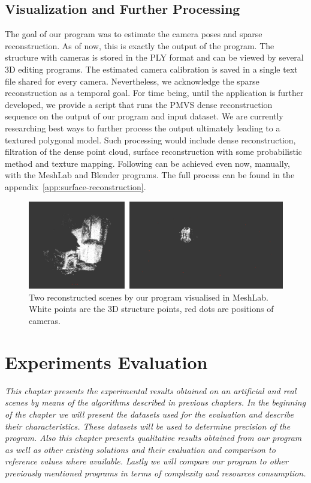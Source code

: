 \section{Visualization and Further Processing}
The goal of our program was to estimate the camera poses and sparse reconstruction. As of now, this is exactly the output of the program. The structure with cameras is stored in the PLY format and can be viewed by several 3D editing programs. The estimated camera calibration is saved in a single text file shared for every camera. Nevertheless, we acknowledge the sparse reconstruction as a temporal goal. For time being, until the application is further developed, we provide a script that runs the PMVS dense reconstruction sequence on the output of our program and input dataset. We are currently researching best ways to further process the output ultimately leading to a textured polygonal model. Such processing would include dense reconstruction, filtration of the dense point cloud, surface reconstruction with some probabilistic method and texture mapping. Following can be achieved even now, manually, with the MeshLab and Blender programs. The full process can be found in the appendix~\ref{app:surface-reconstruction}.

\begin{figure}[ht]
	\begin{center}
		\includegraphics[keepaspectratio,width=\textwidth]{fig/visualisation.pdf}
	\end{center}
	\caption{Two reconstructed scenes by our program visualised in MeshLab. White points are the 3D structure points, red dots are positions of cameras.}
	\label{fig:visualisation}
\end{figure}

\chapter{Experiments Evaluation}
\label{chapter:experiments}
\textit{This chapter presents the experimental results obtained on an artificial and real scenes by means of the algorithms described in previous chapters. In the beginning of the chapter we will present the datasets used for the evaluation and describe their characteristics. These datasets will be used to determine precision of the program. Also this chapter presents qualitative results obtained from our program as well as other existing solutions and their evaluation and comparison to reference values where available. Lastly we will compare our program to other previously mentioned programs in terms of complexity and resources consumption. }
